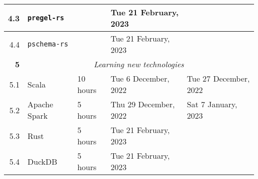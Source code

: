 \documentclass{standalone}
\begin{document}
\begin{tabular}{|r|llll|}
    4.3                                                           & \multicolumn{1}{l|}{\texttt{pregel-rs}}                         & \multicolumn{1}{l|}{}                                          & \multicolumn{1}{l|}{Tue 21 February, 2023}                  &                                                              \\ \hline
    4.4                                                           & \multicolumn{1}{l|}{\texttt{pschema-rs}}                        & \multicolumn{1}{l|}{}                                          & \multicolumn{1}{l|}{Tue 21 February, 2023}                  &                                                              \\ \hline
    \textbf{5}                                                    & \multicolumn{4}{c|}{\textit{Learning new technologies}}                                                                                                                                                                                                       \\ \hline
    5.1                                                           & \multicolumn{1}{l|}{Scala}                                      & \multicolumn{1}{l|}{10 hours}                                  & \multicolumn{1}{l|}{Tue 6 December, 2022}                   & Tue 27 December, 2022                                        \\ \hline
    5.2                                                           & \multicolumn{1}{l|}{Apache Spark}                               & \multicolumn{1}{l|}{5 hours}                                   & \multicolumn{1}{l|}{Thu 29 December, 2022}                  & Sat 7 January, 2023                                          \\ \hline
    5.3                                                           & \multicolumn{1}{l|}{Rust}                                       & \multicolumn{1}{l|}{5 hours}                                   & \multicolumn{1}{l|}{Tue 21 February, 2023}                  &                                                              \\ \hline
    5.4                                                           & \multicolumn{1}{l|}{DuckDB}                                     & \multicolumn{1}{l|}{5 hours}                                   & \multicolumn{1}{l|}{Tue 21 February, 2023}                  &                                                              \\ \hline

\end{tabular}
\end{document}
